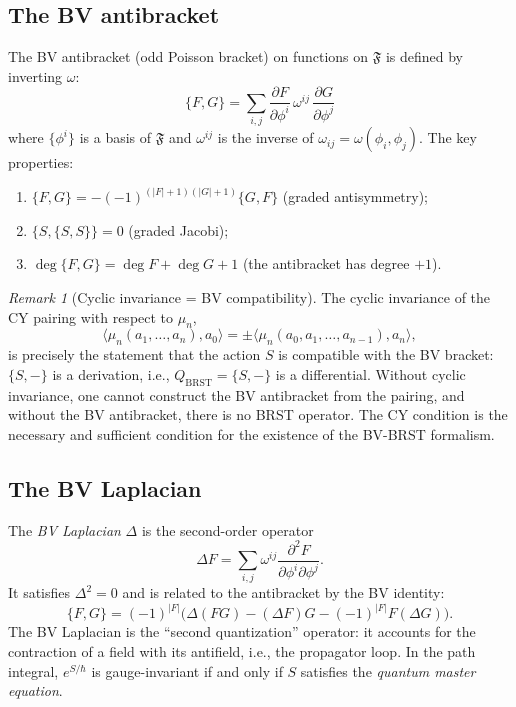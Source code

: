 \documentclass[11pt]{amsart}
\theoremstyle{plain}
\theoremstyle{definition}
\theoremstyle{remark}
\newtheorem{remark}[theorem]{Remark}
\newcommand{\BRST}{\mathrm{BRST}}
\begin{document}
\subsection{The BV antibracket}
\label{subsec:bv-antibracket}

The BV antibracket (odd Poisson bracket) on functions on $\mathfrak{F}$ is defined by inverting $\omega$:
\begin{equation}\label{eq:bv-bracket}
 \{F, G\} = \sum_{i,j} \frac{\partial F}{\partial \phi^i}\, \omega^{ij}\, \frac{\partial G}{\partial \phi^j}
\end{equation}
where $\{\phi^i\}$ is a basis of $\mathfrak{F}$ and $\omega^{ij}$ is the inverse of $\omega_{ij} = \omega(\phi_i, \phi_j)$. The key properties:

\begin{enumerate}[label=(\roman*)]
 \item $\{F, G\} = -(-1)^{(|F|+1)(|G|+1)}\{G, F\}$ (graded antisymmetry);
 \item $\{S, \{S, S\}\} = 0$ (graded Jacobi);
 \item $\deg\{F,G\} = \deg F + \deg G + 1$ (the antibracket has degree $+1$).
\end{enumerate}

\begin{remark}[Cyclic invariance = BV compatibility]
The cyclic invariance of the CY pairing with respect to $\mu_n$,
\[
 \langle \mu_n(a_1, \ldots, a_n), a_0 \rangle = \pm \langle \mu_n(a_0, a_1, \ldots, a_{n-1}), a_n \rangle,
\]
is precisely the statement that the action $S$ is compatible with the BV bracket: $\{S, -\}$ is a derivation, i.e., $Q_{\BRST} = \{S, -\}$ is a differential. Without cyclic invariance, one cannot construct the BV antibracket from the pairing, and without the BV antibracket, there is no BRST operator. The CY condition is the necessary and sufficient condition for the existence of the BV-BRST formalism.
\end{remark}

\subsection{The BV Laplacian}
\label{subsec:bv-laplacian}

The \emph{BV Laplacian} $\Delta$ is the second-order operator
\begin{equation}\label{eq:bv-laplacian}
 \Delta F = \sum_{i,j} \omega^{ij} \frac{\partial^2 F}{\partial \phi^i \partial \phi^j}.
\end{equation}
It satisfies $\Delta^2 = 0$ and is related to the antibracket by the BV identity:
\[
 \{F, G\} = (-1)^{|F|}\bigl(\Delta(FG) - (\Delta F)G - (-1)^{|F|}F(\Delta G)\bigr).
\]
The BV Laplacian is the ``second quantization'' operator: it accounts for the contraction of a field with its antifield, i.e., the propagator loop. In the path integral, $e^{S/\hbar}$ is gauge-invariant if and only if $S$ satisfies the \emph{quantum master equation}.
\end{document}
